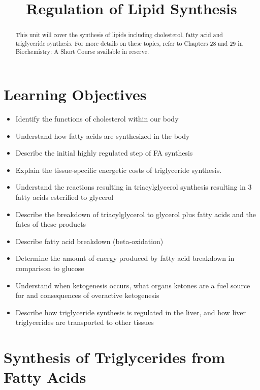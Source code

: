 \documentclass{tufte-handout}
\title{Regulation of Lipid Synthesis}
\author{}
\date{}  %
\begin{document}
\maketitle%

\begin{abstract}
\noindent This unit will cover the synthesis of lipids including cholesterol, fatty acid and triglyceride synthesis.  For more details on these topics, refer to Chapters 28 and 29 in Biochemistry: A Short Course available in reserve\cite{Berg2015}.
\end{abstract}

\tableofcontents

\pagebreak
\section{Learning Objectives}

\begin{itemize}
\item Identify the functions of cholesterol within our body
\item Understand how fatty acids are synthesized in the body
\item Describe the initial highly regulated step of FA synthesis
\item Explain the tissue-specific energetic costs of triglyceride synthesis.
\item Understand the reactions resulting in triacylglycerol synthesis resulting in 3 fatty acids esterified to glycerol
\item Describe the breakdown of triacylglycerol to glycerol plus fatty acids and the fates of these products
\item Describe fatty acid breakdown (beta-oxidation)
\item Determine the amount of energy produced by fatty acid breakdown in comparison to glucose
\item Understand when ketogenesis occurs, what organs ketones are a fuel source for and consequences of overactive ketogenesis
\item Describe how triglyceride synthesis is regulated in the liver, and how liver triglycerides are transported to other tissues




\end{itemize}

\section{Synthesis of Triglycerides from Fatty Acids}
\end{document}
